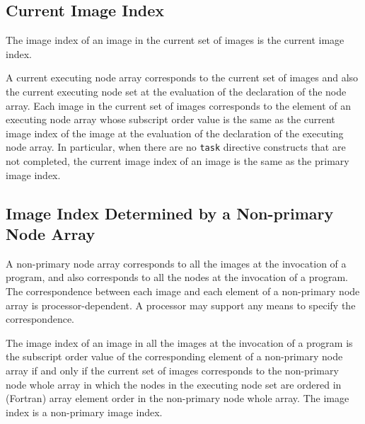 \subsection{Current Image Index}

The image index of an image in the current set of images is
the current image index.

A current executing node array corresponds to the 
current set of images and also the current executing node set 
at the evaluation of the declaration of the node array.
Each image in the current set of images corresponds 
to the element of an executing node array whose
subscript order value is the same as the current image index
of the image at the evaluation of the declaration of the executing node array.
In particular, when there are no {\tt task} directive constructs that are not
completed, the current image index of an image is the same as the
primary image index.



\subsection{Image Index Determined by a Non-primary Node Array}


A non-primary node array corresponds to all the images at the invocation of
a program, and also corresponds to all the nodes at the invocation of
a program. The correspondence between each image and 
each element of a non-primary node array is processor-dependent.
A processor may support any means to specify the correspondence.

The image index of an image in all the images at the invocation 
of a program is the subscript order value of the corresponding element of
a non-primary node array if and only if the current set of images
corresponds to the non-primary node whole array in which
the nodes in the executing node set are ordered in (Fortran) array element order in the non-primary node whole array.
The image index is a non-primary image index. 

